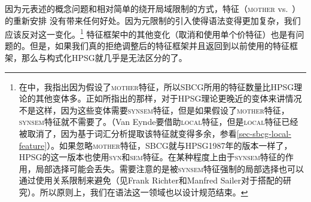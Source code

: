 因为元表述的概念问题和相对简单的绕开局域限制的方式，特征（\textsc{mother} vs.\ \synsemc）的重新安排 没有带来任何好处。因为元限制的引入使得语法变得更加复杂，我们应该反对这一变化。\footnote{%
  在中，我指出因为假设了\textsc{mother}特征，所以SBCG所用的特征数量比HPSG理论的其他变体多。正如\citet{VanEynde2015a}所指出的那样，对于HPSG理论更晚近的变体来讲情况不是这样，因为这些变体需要\textsc{synsem}特征，但是如果假设了\textsc{mother}特征，\textsc{synsem}特征就不需要了。（Van Eynde要借助\textsc{local}特征，但是\textsc{local}特征已经被取消了，因为基于词汇分析提取该特征就变得多余，参看\ref{sec-sbcg-local-feature}）。如果忽略\textsc{mother}特征，SBCG就与HPSG1987年的版本\citep{ps}一样了，HPSG的这一版本也使用\textsc{syn}和\textsc{sem}特征。在某种程度上由于\textsc{synsem}特征的作用，局部选择可能会丢失\citep[]{Sag2012a}。需要注意的是被\textsc{synsem}特征强制的局部选择也可以通过使用关系限制来避免（见Frank Richter和Manfred Sailer对于搭配的研究\citep{RS99b-u,SS2003a}）。所以原则上，我们在语法这一领域也以设计规范结束。%
} 特征框架中的其他变化（取消\localfc 和使用单个价特征）也是有问题的。但是，如果我们真的拒绝调整后的特征框架并且返回到以前使用的特征框架，那么\sbcgc 与构式化HPSG\citep{Sag97a}就几乎是无法区分的了。

